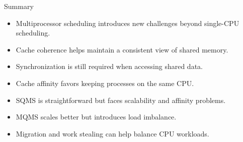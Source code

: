 \begin{frame}{Summary}

\begin{itemize}
    \item Multiprocessor scheduling introduces new challenges beyond
    single-CPU scheduling.

    \item Cache coherence helps maintain a consistent view of shared memory.

    \item Synchronization is still required when accessing shared data.

    \item Cache affinity favors keeping processes on the same CPU.

    \item SQMS is straightforward but faces scalability and affinity
    problems.

    \item MQMS scales better but introduces load imbalance.

    \item Migration and work stealing can help balance CPU workloads.
\end{itemize}

\end{frame}